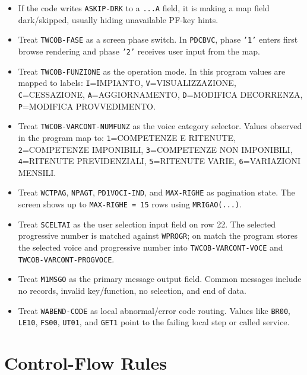 \documentclass[11pt,a4paper]{article}
\begin{document}
\begin{itemize}
  \item If the code writes \texttt{ASKIP-DRK} to a \texttt{...A} field, it is making a map field dark/skipped, usually hiding unavailable PF-key hints.
  \item Treat \texttt{TWCOB-FASE} as a screen phase switch. In \texttt{PDCBVC}, phase \texttt{'1'} enters first browse rendering and phase \texttt{'2'} receives user input from the map.
  \item Treat \texttt{TWCOB-FUNZIONE} as the operation mode. In this program values are mapped to labels: \texttt{I}=IMPIANTO, \texttt{V}=VISUALIZZAZIONE, \texttt{C}=CESSAZIONE, \texttt{A}=AGGIORNAMENTO, \texttt{D}=MODIFICA DECORRENZA, \texttt{P}=MODIFICA PROVVEDIMENTO.
  \item Treat \texttt{TWCOB-VARCONT-NUMFUNZ} as the voice category selector. Values observed in the program map to: \texttt{1}=COMPETENZE E RITENUTE, \texttt{2}=COMPETENZE IMPONIBILI, \texttt{3}=COMPETENZE NON IMPONIBILI, \texttt{4}=RITENUTE PREVIDENZIALI, \texttt{5}=RITENUTE VARIE, \texttt{6}=VARIAZIONI MENSILI.
  \item Treat \texttt{WCTPAG}, \texttt{NPAGT}, \texttt{PD1VOCI-IND}, and \texttt{MAX-RIGHE} as pagination state. The screen shows up to \texttt{MAX-RIGHE = 15} rows using \texttt{MRIGAO(...)}.
  \item Treat \texttt{SCELTAI} as the user selection input field on row 22. The selected progressive number is matched against \texttt{WPROGR}; on match the program stores the selected voice and progressive number into \texttt{TWCOB-VARCONT-VOCE} and \texttt{TWCOB-VARCONT-PROGVOCE}.
  \item Treat \texttt{M1MSGO} as the primary message output field. Common messages include no records, invalid key/function, no selection, and end of data.
  \item Treat \texttt{WABEND-CODE} as local abnormal/error code routing. Values like \texttt{BR00}, \texttt{LE10}, \texttt{FS00}, \texttt{UT01}, and \texttt{GET1} point to the failing local step or called service.
\end{itemize}

\section*{Control-Flow Rules}
\end{document}
